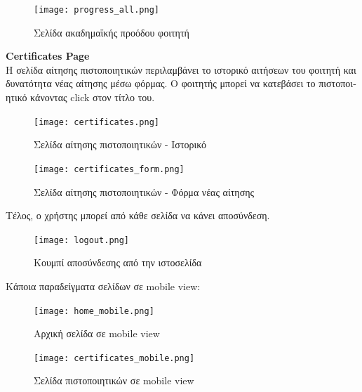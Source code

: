 \documentclass[manuscript,screen,review]{acmart}
\newcommand{\gr}[1]{\foreignlanguage{greek}{#1}}
\begin{document}
\begin{figure}[H]
    \centering
    \texttt{[image: progress\_all.png]}
    \caption{\gr{Σελίδα ακαδημαϊκής προόδου φοιτητή}}
    \label{fig:enter-label}
\end{figure}

\textbf{Certificates Page}
\\\gr{Η σελίδα αίτησης πιστοποιητικών περιλαμβάνει το ιστορικό αιτήσεων του φοιτητή και δυνατότητα νέας αίτησης μέσω φόρμας. Ο φοιτητής μπορεί να κατεβάσει το πιστοποιητικό κάνοντας} click \gr{στον τίτλο του.}

\begin{figure}[H]
    \centering
    \texttt{[image: certificates.png]}
    \caption{\gr{Σελίδα αίτησης πιστοποιητικών - Ιστορικό}}
    \label{fig:enter-label}
\end{figure}

\begin{figure}[H]
    \centering
    \texttt{[image: certificates\_form.png]}
    \caption{\gr{Σελίδα αίτησης πιστοποιητικών - Φόρμα νέας αίτησης}}
    \label{fig:enter-label}
\end{figure}

\gr{Τέλος, ο χρήστης μπορεί από κάθε σελίδα να κάνει αποσύνδεση.}

\begin{figure}[H]
    \centering
    \texttt{[image: logout.png]}
    \caption{\gr{Κουμπί αποσύνδεσης από την ιστοσελίδα}}
    \label{fig:enter-label}
\end{figure}

\gr{Κάποια παραδείγματα σελίδων σε} mobile view:

\begin{figure}[H]
    \centering
    \texttt{[image: home\_mobile.png]}
    \caption{\gr{Αρχική σελίδα σε} mobile view}
    \label{fig:enter-label}
\end{figure}

\begin{figure}[H]
    \centering
    \texttt{[image: certificates\_mobile.png]}
    \caption{\gr{Σελίδα πιστοποιητικών σε} mobile view}
    \label{fig:enter-label}
\end{figure}
\end{document}
